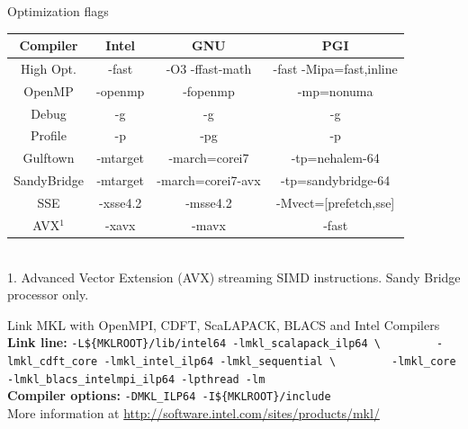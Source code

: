 \documentclass[final,t]{beamer}
\begin{document}
\begin{frame}[fragile]{}
\begin{columns}[t]
\begin{column}{.32\linewidth}
 
      \begin{block}{Optimization flags}
        \vspace*{-2ex}
           \begin{center}
           \begin{tabular}{|c|c|c|c|}
           \hline 
           \textbf{Compiler} & \textbf{Intel} & \textbf{GNU} & \textbf{PGI} \\ 
           \hline 
           High Opt. & -fast & -O3 -ffast-math & -fast -Mipa=fast,inline \\ 
           \hline 
           OpenMP & -openmp & -fopenmp & -mp=nonuma \\ 
           \hline 
           Debug & -g & -g & -g \\ 
           \hline 
           Profile & -p & -pg & -p \\ 
           \hline 
           Gulftown & -mtarget & -march=corei7  & -tp=nehalem-64 \\ 
           \hline 
           SandyBridge & -mtarget & -march=corei7-avx  & -tp=sandybridge-64 \\ 
           \hline 
           SSE & -xsse4.2 & -msse4.2 & -Mvect=[prefetch,sse] \\ 
           \hline 
           AVX$^1$ & -xavx & -mavx & -fast \\ 
           \hline 
           \end{tabular} 
           \begin{footnotesize}
            \\1. Advanced Vector Extension (AVX) streaming SIMD instructions. Sandy Bridge processor only.
           \end{footnotesize}
           \end{center}
        \vspace*{-2ex}
      \end{block}
     
      \begin{block}{Link MKL with OpenMPI, CDFT, ScaLAPACK, BLACS and Intel Compilers}
      \textbf{Link line:} \verb|-L${MKLROOT}/lib/intel64 -lmkl_scalapack_ilp64 \|
      \verb|        -lmkl_cdft_core -lmkl_intel_ilp64 -lmkl_sequential \|
      \verb|        -lmkl_core -lmkl_blacs_intelmpi_ilp64 -lpthread -lm|\\
      \textbf{Compiler options: }      \verb|-DMKL_ILP64 -I${MKLROOT}/include|\\
      More information at \url{http://software.intel.com/sites/products/mkl/}
      \end{block}
 

\end{column}
\end{columns}
\end{frame}
\end{document}
